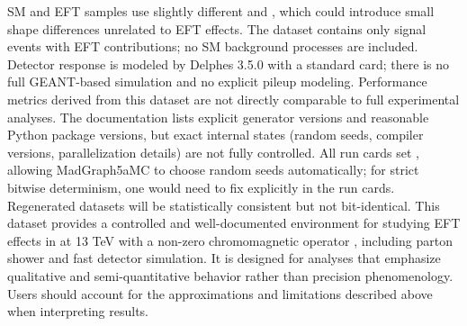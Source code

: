 \markdownRendererUlEndTight \markdownRendererUlItemEnd 
\markdownRendererUlItem {}\markdownRendererInterblockSeparator
{}\markdownRendererUlBeginTight
\markdownRendererUlItem SM and EFT samples use slightly different  and , which could introduce small shape differences unrelated to EFT effects.\markdownRendererUlItemEnd 
\markdownRendererUlEndTight \markdownRendererUlItemEnd 
\markdownRendererUlItem {}\markdownRendererInterblockSeparator
{}\markdownRendererUlBeginTight
\markdownRendererUlItem The dataset contains only signal  events with EFT contributions; no SM background processes are included.\markdownRendererUlItemEnd 
\markdownRendererUlEndTight \markdownRendererUlItemEnd 
\markdownRendererUlItem {}\markdownRendererInterblockSeparator
{}\markdownRendererUlBeginTight
\markdownRendererUlItem Detector response is modeled by Delphes 3.5.0 with a standard card; there is no full GEANT-based simulation and no explicit pileup modeling.\markdownRendererUlItemEnd 
\markdownRendererUlItem Performance metrics derived from this dataset are not directly comparable to full experimental analyses.\markdownRendererUlItemEnd 
\markdownRendererUlEndTight \markdownRendererUlItemEnd 
\markdownRendererUlItem {}\markdownRendererInterblockSeparator
{}\markdownRendererUlBeginTight
\markdownRendererUlItem The documentation lists explicit generator versions and reasonable Python package versions, but exact internal states (random seeds, compiler versions, parallelization details) are not fully controlled.\markdownRendererUlItemEnd 
\markdownRendererUlItem All run cards set , allowing MadGraph5\markdownRendererUnderscore{}aMC to choose random seeds automatically; for strict bitwise determinism, one would need to fix  explicitly in the run cards.\markdownRendererUlItemEnd 
\markdownRendererUlItem Regenerated datasets will be statistically consistent but not bit-identical.\markdownRendererUlItemEnd 
\markdownRendererUlEndTight \markdownRendererUlItemEnd 
\markdownRendererUlEnd \markdownRendererInterblockSeparator
{}
\markdownRendererSectionEnd \markdownRendererSectionBegin
{}\markdownRendererInterblockSeparator
{}This dataset provides a controlled and well-documented environment for studying EFT effects in  at 13 TeV with a non-zero chromomagnetic operator , including parton shower and fast detector simulation. It is designed for analyses that emphasize qualitative and semi-quantitative behavior rather than precision phenomenology. Users should account for the approximations and limitations described above when interpreting results.
\markdownRendererSectionEnd 
\markdownRendererSectionEnd 
\markdownRendererSectionEnd \markdownRendererDocumentEnd